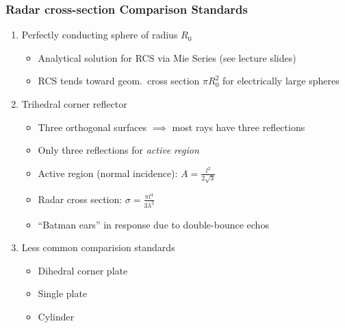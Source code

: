 \subsubsection{Radar cross-section Comparison Standards}
\begin{enumerate}
        \item Perfectly conducting sphere of radius $R_{0}$
        \begin{itemize}
                \item Analytical solution for RCS via Mie Series (see lecture slides)
                \item RCS tends toward geom.\ cross section $\pi R_{0}^{2}$ for electrically large spheres
        \end{itemize}
        \item Trihedral corner reflector
        \begin{itemize}
                \item Three orthogonal surfaces $\implies$ most rays have three reflections
                \item Only three reflections for \textit{active region}
                \item Active region (normal incidence): $A = \frac{l^{2}}{2\sqrt{3}}$
                \item Radar cross section: $\sigma = \frac{\pi l^{4}}{3 \lambda^{2}}$
                \item ``Batman ears'' in response due to double-bounce echos
        \end{itemize}
        \item Less common comparision standards
        \begin{itemize}
          \item Dihedral corner plate
          \item Single plate
          \item Cylinder
        \end{itemize}
\end{enumerate}
